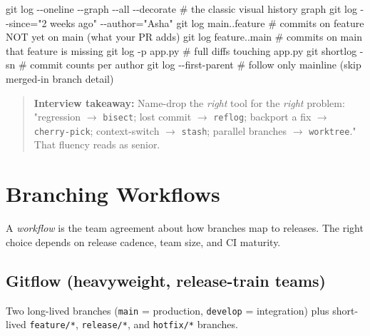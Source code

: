 \documentclass[11pt]{article}
\newenvironment{Shaded}{\begin{snugshade}}{\end{snugshade}}
\newcommand{\AttributeTok}[1]{\textcolor[rgb]{0.16,0.50,0.73}{#1}}
\newcommand{\CommentTok}[1]{\textcolor[rgb]{0.48,0.49,0.49}{#1}}
\newcommand{\FunctionTok}[1]{\textcolor[rgb]{0.56,0.27,0.68}{#1}}
\newcommand{\NormalTok}[1]{\textcolor[rgb]{0.81,0.81,0.76}{#1}}
\newcommand{\OperatorTok}[1]{\textcolor[rgb]{0.81,0.81,0.76}{#1}}
\newcommand{\StringTok}[1]{\textcolor[rgb]{0.96,0.31,0.31}{#1}}
\begin{document}
\begin{Shaded}
\begin{Highlighting}[]
\FunctionTok{git}\NormalTok{ log }\AttributeTok{{-}{-}oneline} \AttributeTok{{-}{-}graph} \AttributeTok{{-}{-}all} \AttributeTok{{-}{-}decorate}   \CommentTok{\# the classic visual history graph}
\FunctionTok{git}\NormalTok{ log }\AttributeTok{{-}{-}since}\OperatorTok{=}\StringTok{"2 weeks ago"} \AttributeTok{{-}{-}author}\OperatorTok{=}\StringTok{"Asha"}
\FunctionTok{git}\NormalTok{ log main..feature            }\CommentTok{\# commits on feature NOT yet on main (what your PR adds)}
\FunctionTok{git}\NormalTok{ log feature..main            }\CommentTok{\# commits on main that feature is missing}
\FunctionTok{git}\NormalTok{ log }\AttributeTok{{-}p}\NormalTok{ app.py                }\CommentTok{\# full diffs touching app.py}
\FunctionTok{git}\NormalTok{ shortlog }\AttributeTok{{-}sn}                 \CommentTok{\# commit counts per author}
\FunctionTok{git}\NormalTok{ log }\AttributeTok{{-}{-}first{-}parent}           \CommentTok{\# follow only mainline (skip merged{-}in branch detail)}
\end{Highlighting}
\end{Shaded}

\begin{quote}
\textbf{Interview takeaway:} Name-drop the \emph{right} tool for the \emph{right} problem: "regression \(\rightarrow\) \texttt{bisect}; lost commit \(\rightarrow\) \texttt{reflog}; backport a fix \(\rightarrow\) \texttt{cherry-pick}; context-switch \(\rightarrow\) \texttt{stash}; parallel branches \(\rightarrow\) \texttt{worktree}." That fluency reads as senior.
\end{quote}

\section{Branching Workflows}\label{branching-workflows}

A \emph{workflow} is the team agreement about how branches map to releases. The right choice depends on release cadence, team size, and CI maturity.

\subsection{Gitflow (heavyweight, release-train teams)}\label{gitflow-heavyweight-release-train-teams}

Two long-lived branches (\texttt{main} = production, \texttt{develop} = integration) plus short-lived \texttt{feature/*}, \texttt{release/*}, and \texttt{hotfix/*} branches.
\end{document}
